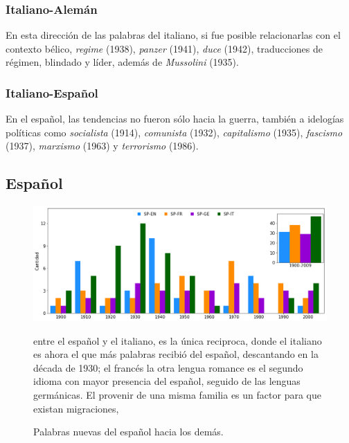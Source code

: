 \subsubsection*{Italiano-Alemán}%

En esta dirección de las palabras del italiano, si fue posible relacionarlas con el contexto bélico,  \textit{regime} (1938), \textit{panzer} (1941), \textit{duce} (1942),  traducciones de régimen, blindado y líder, además de \textit{Mussolini} (1935). 



\subsubsection*{Italiano-Español}%

En el español, las tendencias no fueron sólo hacia la guerra, también a idelogías políticas como \textit{socialista} (1914), \textit{comunista} (1932), \textit{capitalismo} (1935), \textit{fascismo} (1937),  \textit{marxismo} (1963) y \textit{terrorismo} (1986). 



\subsection{Español}%

\begin{figure}[h!]
	\centering
	\includegraphics[scale=.38]{Cap_3/NC_SP.png}
	\label{fig.NC_SP}
	\caption{Palabras nuevas del español hacia los demás.}
	\smallskip
	\small
	entre el español y el italiano, es la única reciproca, donde  el italiano es ahora el que más palabras recibió del español, descantando en la década de 1930; el francés la otra lengua romance es el segundo idioma con mayor presencia del español, seguido de las lenguas germánicas. El provenir de una misma familia es un factor para que existan migraciones,
	
\end{figure}

